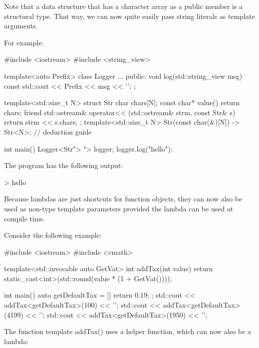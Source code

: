 
Note that a data structure that has a character array as a public member is a structural type. That way, we can now quite easily pass string literals as template arguments.

For example:


\begin{cpp}
#include <iostream>
#include <string_view>

template<auto Prefix>
class Logger {
	...
public:
	void log(std::string_view msg) const {
		std::cout << Prefix << msg << '\n';
	}
};

template<std::size_t N>
struct Str {
	char chars[N];
	const char* value() {
		return chars;
	}
	friend std::ostream& operator<< (std::ostream& strm, const Str& s) {
		return strm << s.chars;
	}
};
template<std::size_t N> Str(const char(&)[N]) -> Str<N>; // deduction guide

int main()
{
	Logger<Str{"> "}> logger;
	logger.log("hello");
}
\end{cpp}

The program has the following output:

\begin{shell}
> hello
\end{shell}


Because lambdas are just shortcuts for function objects, they can now also be used as non-type template parameters provided the lambda can be used at compile time.

Consider the following example:


\begin{cpp}
#include <iostream>
#include <cmath>

template<std::invocable auto GetVat>
int addTax(int value)
{
	return static_cast<int>(std::round(value * (1 + GetVat())));
}

int main()
{
	auto getDefaultTax = [] {
		return 0.19;
	};
	std::cout << addTax<getDefaultTax>(100) << '\n';
	std::cout << addTax<getDefaultTax>(4199) << '\n';
	std::cout << addTax<getDefaultTax>(1950) << '\n';
}
\end{cpp}

The function template addTax() uses a helper function, which can now also be a lambda:

